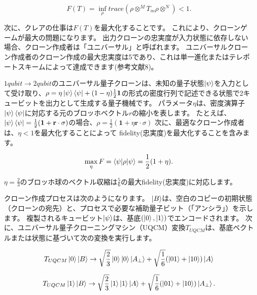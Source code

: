 \begin{equation}
\label{263}
F(T) = \inf_{\rho} trace ( \rho \otimes ^M  T_m \rho \otimes ^N) < 1.
\end{equation}

次に、クレアの仕事は$F(T)$を最大化することです。 これにより、クローンゲームが最大の問題になります。
出力クローンの忠実度が入力状態に依存しない場合、クローン作成者は「ユニバーサル」と呼ばれます。
ユニバーサルクローン作成者のクローン作成の最大忠実度は5であり、これは単一進化またはテレポートスキームによって達成できます(参考文献8)。

$1 qubit \to 2 qubit$のユニバーサル量子クローンは、未知の量子状態$\ket{\psi}$を入力として受け取り、$\rho = \eta \ket{\psi} \bra{\psi} + (1 - \eta) \frac{1}{2} \mathbf{1} $の形式の密度行列で記述できる状態で2キュービットを出力として生成する量子機械です。
パラメータ$\eta$は、密度演算子$\ket{\psi} \bra{\psi} $に対応する元のブロッホベクトル$r$の縮小を表します。
たとえば、$\ket{\psi} \bra{\psi} = \frac{1}{2} ( \mathbf{1} + \mathbf{r} \cdot \sigma)$の場合、$ \rho = \frac{1}{2} ( \mathbf{1} + \eta \mathbf{r} \cdot \sigma)$
次に、最適なクローン作成者は、$ \eta <1$を最大化することによって fidelity(忠実度)を最大化することを含みます。

\begin{equation}
\label{264}
\max_{\eta} F = \braket{\psi | \rho | \psi} = \frac{1}{2}(1 + \eta).
\end{equation}

$\eta= \frac{2}{3}$のブロッホ球のベクトル収縮は$\frac{5}{6}$の最大fidelity(忠実度)に対応します。

クローン作成プロセスは次のようになります。 $\ket{B}$は、空白のコピーの初期状態（クローンの宛先）と、プロセスで必要な補助量子ビット（「アンシラ」）を示します。 
複製されるキュービット$\ket{\psi}$は、基底$(\ket{0}, \ket{1})$でエンコードされます。 
次に、ユニバーサル量子クローニングマシン（UQCM）変換$T_{UQCM}$は、基底ベクトルまたは状態に基づいて次の変換を実行します。

\begin{equation}
\label{265}
T_{UQCM} \ket{0} \ket{B} 
\to 
\sqrt{\frac{2}{3}} \ket{0} \ket{0} \ket{A_\bot}
+
\sqrt{\frac{1}{6}} ( \ket{01} + \ket{10} )\ket{A}
\end{equation}

\begin{equation}
\label{266}
T_{UQCM} \ket{1} \ket{B} 
\to 
\sqrt{\frac{2}{3}} \ket{1} \ket{1} \ket{A}
+
\sqrt{\frac{1}{6}} ( \ket{01} + \ket{10} )\ket{A_\bot}.
\end{equation}

